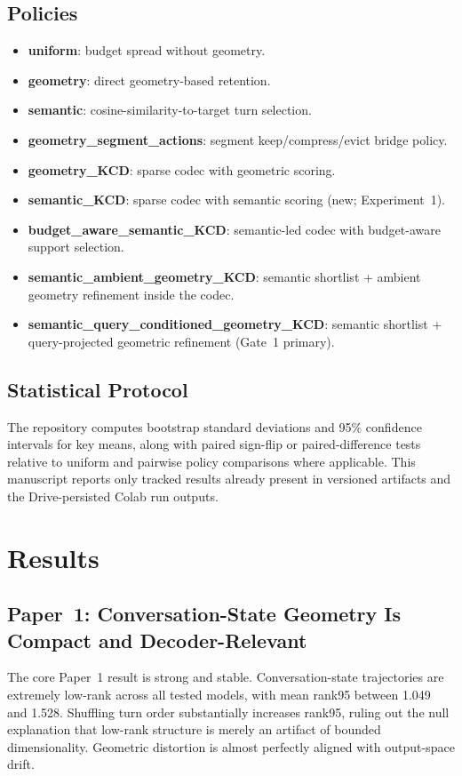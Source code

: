 \documentclass[conference]{IEEEtran}
\begin{document}
\subsection{Policies}
\begin{itemize}[leftmargin=1.4em]
    \item \textbf{uniform}: budget spread without geometry.
    \item \textbf{geometry}: direct geometry-based retention.
    \item \textbf{semantic}: cosine-similarity-to-target turn selection.
    \item \textbf{geometry\_segment\_actions}: segment keep/compress/evict bridge policy.
    \item \textbf{geometry\_KCD}: sparse codec with geometric scoring.
    \item \textbf{semantic\_KCD}: sparse codec with semantic scoring (new; Experiment~1).
    \item \textbf{budget\_aware\_semantic\_KCD}: semantic-led codec with budget-aware support selection.
    \item \textbf{semantic\_ambient\_geometry\_KCD}: semantic shortlist + ambient geometry refinement inside the codec.
    \item \textbf{semantic\_query\_conditioned\_geometry\_KCD}: semantic shortlist + query-projected geometric refinement (Gate~1 primary).
\end{itemize}

\subsection{Statistical Protocol}
The repository computes bootstrap standard deviations and 95\% confidence intervals for key means, along with paired sign-flip or paired-difference tests relative to uniform and pairwise policy comparisons where applicable. This manuscript reports only tracked results already present in versioned artifacts and the Drive-persisted Colab run outputs.

\section{Results}
\subsection{Paper~1: Conversation-State Geometry Is Compact and Decoder-Relevant}
The core Paper~1 result is strong and stable. Conversation-state trajectories are extremely low-rank across all tested models, with mean rank95 between 1.049 and 1.528. Shuffling turn order substantially increases rank95, ruling out the null explanation that low-rank structure is merely an artifact of bounded dimensionality. Geometric distortion is almost perfectly aligned with output-space drift.
\end{document}
